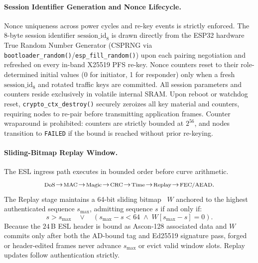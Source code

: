 \documentclass[conference]{IEEEtran}
\begin{document}
\paragraph{Session Identifier Generation and Nonce Lifecycle.} Nonce uniqueness across power cycles and re-key events is strictly enforced. The 8-byte session identifier $\text{session\_id}_8$ is drawn directly from the ESP32 hardware True Random Number Generator (CSPRNG via \texttt{bootloader\_random()}/\texttt{esp\_fill\_random()}) upon each pairing negotiation and refreshed on every in-band X25519 PFS re-key. Nonce counters reset to their role-determined initial values (0 for initiator, 1 for responder) only when a fresh $\text{session\_id}_8$ and rotated traffic keys are committed. All session parameters and counters reside exclusively in volatile internal SRAM. Upon reboot or watchdog reset, \texttt{crypto\_ctx\_destroy()} securely zeroizes all key material and counters, requiring nodes to re-pair before transmitting application frames. Counter wraparound is prohibited: counters are strictly bounded at $2^{56}$, and nodes transition to \texttt{FAILED} if the bound is reached without prior re-keying.

\paragraph{Sliding-Bitmap Replay Window.} The ESL ingress path executes in bounded order before curve arithmetic.
\begin{equation}
\text{\footnotesize DoS}\!\rightarrow\!\text{\footnotesize MAC}\!\rightarrow\!\text{\footnotesize Magic}\!\rightarrow\!\text{\footnotesize CRC}\!\rightarrow\!\text{\footnotesize Time}\!\rightarrow\!\text{\footnotesize Replay}\!\rightarrow\!\text{\footnotesize FEC/AEAD}.
\label{eq:rx_order}
\end{equation}
The Replay stage maintains a 64-bit sliding bitmap~\cite{donenfeld2017} $W$ anchored to the highest authenticated sequence $s_{\max}$, admitting sequence $s$ if and only if:
\begin{equation}
s > s_{\max} \quad \lor \quad \left(s_{\max} - s < 64 \;\land\; W[s_{\max} - s] = 0\right).
\label{eq:replay}
\end{equation}
Because the $24$\,B ESL header is bound as Ascon-128 associated data and $W$ commits only after both the AD-bound tag and Ed25519 signature pass, forged or header-edited frames never advance $s_{\max}$ or evict valid window slots. Replay updates follow authentication strictly.
\end{document}

